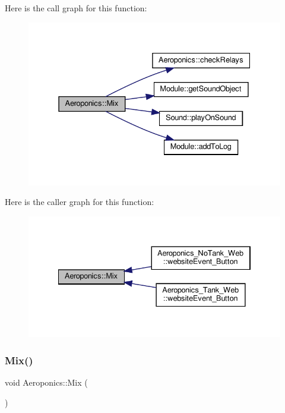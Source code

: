 Here is the call graph for this function\+:
\nopagebreak
\begin{figure}[H]
\begin{center}
\leavevmode
\includegraphics[width=331pt]{class_aeroponics_a509f52009146d740a519154b5beca6ff_cgraph}
\end{center}
\end{figure}
Here is the caller graph for this function\+:
\nopagebreak
\begin{figure}[H]
\begin{center}
\leavevmode
\includegraphics[width=334pt]{class_aeroponics_a509f52009146d740a519154b5beca6ff_icgraph}
\end{center}
\end{figure}
\mbox{\label{class_aeroponics_a509f52009146d740a519154b5beca6ff}} 
\subsubsection{\texorpdfstring{Mix()}{Mix()}\hspace{0.1cm}{\footnotesize\ttfamily [2/2]}}
{\footnotesize\ttfamily void Aeroponics\+::\+Mix (\begin{DoxyParamCaption}{ }\end{DoxyParamCaption})\hspace{0.3cm}{\ttfamily [protected]}}

